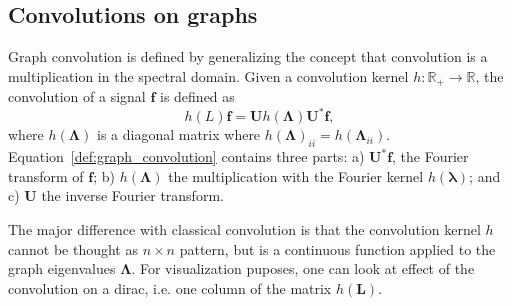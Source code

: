 \documentclass[preprint,12pt,authoryear]{elsarticle}
\newcommand{\nati}[1]{{\color[rgb]{.1,.6,.1}{#1}}}
\newcommand{\todo}[1]{{\color[rgb]{.6,.1,.6}{#1}}}
\newcommand{\assign}[1]{{\color[rgb]{.8,.5,.8}{Assigned: #1 }}}
\renewcommand{\b}[1]{{\bm{#1}}}   %
\newcommand{\1}{\b{1}}              %
\newcommand{\0}{\b{0}}              %
\renewcommand{\L}{\b{L}} %
\newcommand{\U}{\b{U}}
\newcommand{\bLambda}{\b{\Lambda}}
\newcommand{\blambda}{\b{\lambda}}
\begin{document}
\subsection{Convolutions on graphs}
\assign{Nathanaël, Michaël} \todo{Add a few extra references}

Graph convolution is defined by generalizing the concept that convolution is a
multiplication in the spectral domain. Given a convolution kernel 
$h:\mathbb{R}_+\rightarrow\mathbb{R}$, the convolution of a signal $\b{f}$ 
is defined as
\begin{equation} \label{def:graph_convolution}
h(L)\b{f} = \U h(\bLambda) \U^* \b{f},
\end{equation}
where $h(\bLambda)$ is a diagonal matrix where $h(\bLambda)_{ii}=h(\bLambda_{ii})$.
Equation~\ref{def:graph_convolution} contains three parts: a) $\U^* \b{f}$, the 
Fourier transform of $\b{f}$; b) $h(\bLambda)$ the multiplication with the Fourier 
kernel $h(\blambda)$; and c) $\U$ the inverse Fourier transform.

The major difference with classical convolution is that the convolution kernel
$h$ cannot be thought as $n \times n$ pattern, but is a continuous function
applied to the graph eigenvalues $\bLambda$. For visualization puposes, one can
look at effect of the convolution on a dirac, i.e. one column of the matrix
$h(\L)$. \nati{However, due to the non regularity of the graph (i.e. the fact
that there is not perfect sampling on the sphere), this visualization will
differ from one node to another. In the specific case of the full sphere, these
difference are negligible in most of the cases. When considering only subpart of
the sphere, one will observe important border effects.}
\end{document}
